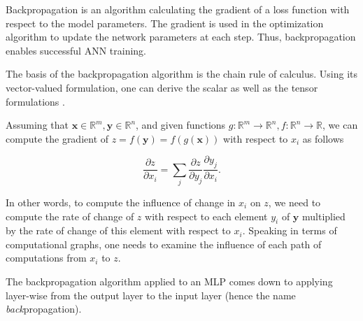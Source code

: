 Backpropagation is an algorithm calculating the gradient of a loss function with respect to the model parameters. The gradient is used in the optimization algorithm to update the network parameters at each step. Thus, backpropagation enables successful \ac{ANN} training.

The basis of the backpropagation algorithm is the chain rule of calculus. Using its vector-valued formulation, one can derive the scalar as well as the tensor formulations \cite{Goodfellow-et-al-2016}.

Assuming that $\pmb{x} \in \mathbb{R}^m, \pmb{y} \in \mathbb{R}^n$, and given functions $g: \mathbb{R}^m \rightarrow \mathbb{R}^n, f: \mathbb{R}^n \rightarrow \mathbb{R}$, we can compute the gradient of $z = f(\pmb{y}) = f(g(\pmb{x}))$ with respect to $x_i$ as follows

\begin{equation}
  \frac{\partial z}{\partial x_i} = \sum \limits_j \frac{\partial z}{\partial y_j} \frac{\partial y_j}{\partial x_i}.
  \label{eq:chain_rule_of_calculus}
\end{equation}

In other words, to compute the influence of change in $x_i$ on $z$, we need to compute the rate of change of $z$ with respect to each element $y_i$ of $\pmb{y}$ multiplied by the rate of change of this element with respect to $x_i$. Speaking in terms of computational graphs, one needs to examine the influence of each path of computations from $x_i$ to $z$.

The backpropagation algorithm applied to an \ac{MLP} comes down to applying  layer-wise from the output layer to the input layer (hence the name \emph{back}propagation).




